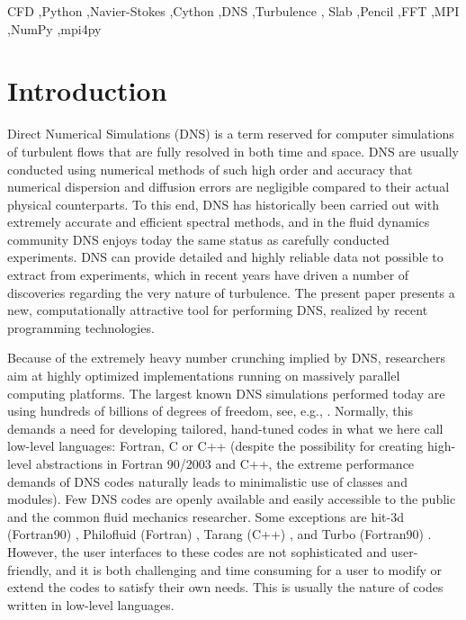 \documentclass[final,3p,times,twocolumn]{elsarticle}
\begin{document}
\begin{frontmatter}
\begin{abstract}
\end{abstract}

\begin{keyword}
CFD \sep Python \sep Navier-Stokes \sep Cython \sep DNS \sep Turbulence \sep 
Slab \sep Pencil \sep FFT \sep MPI \sep NumPy \sep mpi4py

\end{keyword}

\end{frontmatter}

\section{Introduction}
Direct Numerical Simulations (DNS) is a term reserved for computer simulations 
of turbulent flows that are fully resolved in both time and space. DNS are 
usually conducted using numerical methods of such high order and accuracy that 
numerical dispersion and diffusion errors are negligible compared to their 
actual physical
counterparts. To this end, DNS has historically been carried out with extremely 
accurate and efficient spectral methods, and in the fluid dynamics community 
DNS enjoys  today the same status as carefully conducted experiments. DNS can 
provide detailed and highly reliable data not possible to extract from
experiments, which in recent years have driven a number of discoveries 
regarding the very nature of turbulence. The present paper presents a new, 
computationally attractive tool for performing DNS, realized by recent 
programming technologies.

Because of the extremely heavy number crunching implied by DNS,
researchers aim at highly optimized implementations running on
massively parallel computing platforms. The largest known DNS
simulations performed today are using hundreds of billions of degrees
of freedom, see, e.g., \cite{Lee2013, deBruynKops15}. Normally, this demands a 
need for developing tailored, hand-tuned
codes in what we here call low-level languages: Fortran, C or C++ (despite
the possibility for creating high-level abstractions in Fortran 90/2003 and
C++, the extreme performance demands of DNS codes naturally leads to
minimalistic use of classes and modules). Few DNS codes are openly available 
and easily accessible to the public and the common fluid mechanics researcher. 
Some exceptions are hit-3d (Fortran90) \cite{hit-3d}, Philofluid (Fortran) 
\cite{philofluid}, Tarang (C++) \cite{tarang}, and Turbo (Fortran90)
\cite{turbo}. However, the user interfaces to these codes are not sophisticated 
and user-friendly, and it is both challenging and time consuming for a user to
modify or extend the codes to satisfy their own needs. This is usually
the nature of codes written in low-level languages.
\end{document}
